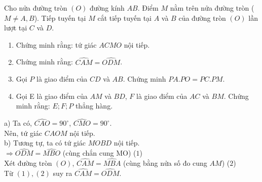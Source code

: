 \begin{ex}%
        Cho nửa đường tròn $(O)$ đường kính $AB$. Điểm $M$ nằm trên nửa đường tròn ($M \ne A, B$). Tiếp tuyến tại $M$ cắt tiếp tuyến tại $A$ và $B$ của đường tròn $(O)$ lần lượt tại $C$ và $D$.
       \begin{enumerate}
        \item
        Chứng minh rằng: tứ giác $ACMO$ nội tiếp.
        \item
        Chứng minh rằng: $\widehat{CAM}=\widehat{ODM}$.
        \item
        Gọi $P$ là giao điểm của $CD$ và $AB$. Chứng minh $PA.PO=PC.PM$.
        \item
        Gọi E là giao điểm của $AM$ và $BD$, $F$ là giao điểm của $AC$ và $BM$. Chứng minh rằng: $E;F;P$ thẳng hàng.
       \end{enumerate}
        \loigiai
        {
             \immini
             {
              a) Ta có, $\widehat{CAO}=90^{\circ}$, $\widehat{CMO}=90^{\circ}$.\\
             Nên, tứ giác $CAOM$ nội tiếp.\\
             b) Tương tự, ta có tứ giác $MOBD$ nội tiếp.\\
             $\Rightarrow \widehat{ODM}=\widehat{MBO}$ (cùng chắn cung MO) ($1$)\\
             Xét đường tròn $(O)$, $\widehat{CAM}=\widehat{MBA}$ (cùng bằng nửa số đo cung $AM$) ($2$)\\
             Từ $(1), (2)$ suy ra $\widehat{CAM}=\widehat{ODM}$.\\}
             {
              }
}
\end{ex}
